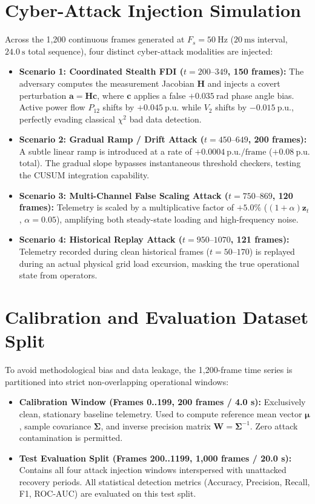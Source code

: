 \documentclass[12pt,a4paper]{report}
\begin{document}
\section{Cyber-Attack Injection Simulation}
Across the 1,200 continuous frames generated at $F_s = 50~\text{Hz}$ ($20~\text{ms}$ interval,
$24.0~\text{s}$ total sequence), four distinct cyber-attack modalities are injected:
\begin{itemize}
    \item \textbf{Scenario 1: Coordinated Stealth FDI ($t = 200\text{--}349$, 150 frames):}
    The adversary computes the measurement Jacobian $\boldsymbol{H}$ and injects a covert
    perturbation $\boldsymbol{a} = \boldsymbol{H}\boldsymbol{c}$, where $\boldsymbol{c}$ applies
    a false $+0.035~\text{rad}$ phase angle bias. Active power flow $P_{12}$ shifts by $+0.045~\text{p.u.}$
    while $V_2$ shifts by $-0.015~\text{p.u.}$, perfectly evading classical $\chi^2$ bad data detection.
    \item \textbf{Scenario 2: Gradual Ramp / Drift Attack ($t = 450\text{--}649$, 200 frames):}
    A subtle linear ramp is introduced at a rate of $+0.0004~\text{p.u./frame}$ ($+0.08~\text{p.u.}$ total).
    The gradual slope bypasses instantaneous threshold checkers, testing the CUSUM integration capability.
    \item \textbf{Scenario 3: Multi-Channel False Scaling Attack ($t = 750\text{--}869$, 120 frames):}
    Telemetry is scaled by a multiplicative factor of $+5.0\%$ ($(1 + \alpha)\boldsymbol{z}_t$, $\alpha = 0.05$),
    amplifying both steady-state loading and high-frequency noise.
    \item \textbf{Scenario 4: Historical Replay Attack ($t = 950\text{--}1070$, 121 frames):}
    Telemetry recorded during clean historical frames ($t = 50\text{--}170$) is replayed during an
    actual physical grid load excursion, masking the true operational state from operators.
\end{itemize}

\section{Calibration and Evaluation Dataset Split}
To avoid methodological bias and data leakage, the 1,200-frame time series is partitioned into
strict non-overlapping operational windows:
\begin{itemize}
    \item \textbf{Calibration Window (Frames 0..199, 200 frames / 4.0 s):} Exclusively clean,
    stationary baseline telemetry. Used to compute reference mean vector $\boldsymbol{\mu}$,
    sample covariance $\boldsymbol{\Sigma}$, and inverse precision matrix $\boldsymbol{W} = \boldsymbol{\Sigma}^{-1}$.
    Zero attack contamination is permitted.
    \item \textbf{Test Evaluation Split (Frames 200..1199, 1,000 frames / 20.0 s):} Contains all
    four attack injection windows interspersed with unattacked recovery periods. All statistical
    detection metrics (Accuracy, Precision, Recall, F1, ROC-AUC) are evaluated on this test split.
\end{itemize}
\end{document}
